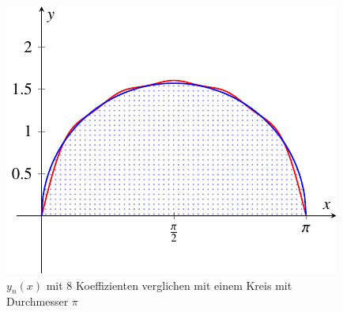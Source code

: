 \begin{figure}
	\centering
	\includegraphics{papers/antennen/images/koeffVergleichKreis.pdf}
	\caption{$y_n(x)$ mit 8 Koeffizienten verglichen mit einem Kreis mit Durchmesser $\pi$}
	\label{antennen:vergleichKreis}
\end{figure}
